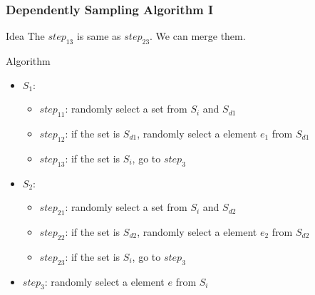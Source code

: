\documentclass[notheorems, aspectratio=54]{beamer}
\begin{document}
\begin{frame}
    \frametitle{Dependently Sampling Algorithm I}
    \begin{block}{Idea}
        The $step_{13}$ is same as $step_{23}$. We can merge them.
    \end{block}
    \begin{block}{Algorithm}
        \begin{itemize}
            \item $S_1$:
            \begin{itemize}
                \item $step_{11}$: randomly select a set from $S_i$ and $S_{d1}$
                \item $step_{12}$: if the set is $S_{d1}$, randomly select a element $e_1$ from $S_{d1}$
                \item $step_{13}$: if the set is $S_i$, go to $step_{3}$
            \end{itemize}
            \item $S_2$:
            \begin{itemize}
                \item $step_{21}$: randomly select a set from $S_i$ and $S_{d2}$
                \item $step_{22}$: if the set is $S_{d2}$, randomly select a element $e_2$ from $S_{d2}$
                \item $step_{23}$: if the set is $S_i$, go to $step_{3}$
            \end{itemize}
            \item $step_{3}$: randomly select a element $e$ from $S_i$
        \end{itemize}
    \end{block}
\end{frame}
\end{document}
